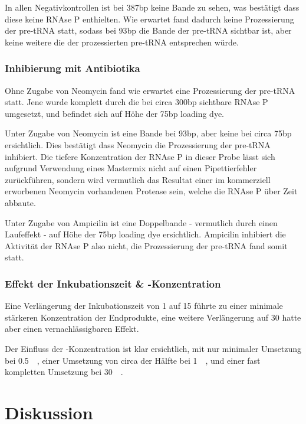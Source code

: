 \documentclass[a4paper,english]{scrreprt}
\begin{document}
In allen Negativkontrollen ist bei 387bp keine Bande zu sehen, was bestätigt
dass diese keine RNAse P enthielten. Wie erwartet fand dadurch keine
Prozessierung der pre-tRNA statt, sodass bei 93bp die Bande der pre-tRNA
sichtbar ist, aber keine weitere die der prozessierten pre-tRNA entsprechen
würde.

\subsection{Inhibierung mit Antibiotika}

Ohne Zugabe von Neomycin fand wie erwartet eine Prozessierung der pre-tRNA
statt. Jene wurde komplett durch die bei circa 300bp sichtbare RNAse P umgesetzt,
und befindet sich auf Höhe der 75bp loading dye.

Unter Zugabe von Neomycin ist eine Bande bei 93bp, aber keine bei circa 75bp
ersichtlich. Dies bestätigt dass Neomycin die Prozessierung der pre-tRNA
inhibiert. Die tiefere Konzentration der RNAse P in dieser Probe lässt sich
aufgrund Verwendung eines Mastermix nicht auf einen Pipettierfehler
zurückführen, sondern wird vermutlich das Resultat einer im kommerziell
erworbenen Neomycin vorhandenen Protease sein, welche die RNAse P über Zeit
abbaute.

Unter Zugabe von Ampicilin ist eine Doppelbande - vermutlich durch einen
Laufeffekt - auf Höhe der 75bp loading dye ersichtlich. Ampicilin inhibiert die
Aktivität der RNAse P also nicht, die Prozessierung der pre-tRNA fand somit
statt.

\subsection{Effekt der Inkubationszeit \& -Konzentration}

Eine Verlängerung der Inkubationszeit von \SI{1}{\min} auf \SI{15}{\min} führte
zu einer minimale stärkeren Konzentration der Endprodukte, eine weitere
Verlängerung auf \SI{30}{\min} hatte aber einen vernachlässigbaren Effekt.

Der Einfluss der -Konzentration ist klar ersichtlich, mit nur minimaler
Umsetzung bei \SI{0.5}{\milli\Molar}, einer Umsetzung von circa der Hälfte bei
\SI{1}{\milli\Molar}, und einer fast kompletten Umsetzung bei
\SI{30}{\milli\Molar}.

\chapter{Diskussion}
\end{document}
